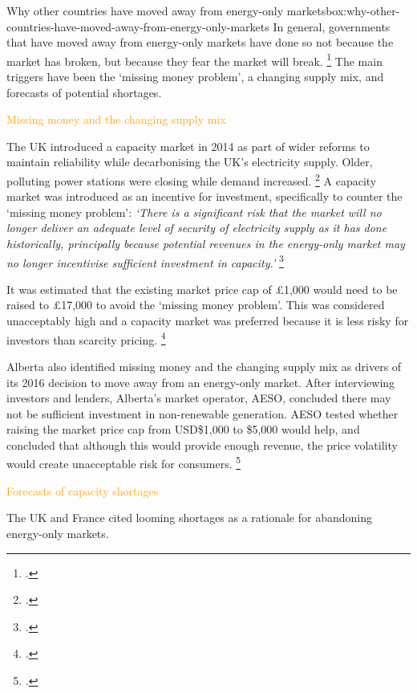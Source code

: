 \documentclass[FrontPage]{grattan}
\newenvironment{alphafootnotes}{}{}
\begin{document}
\begin{bigbox*}{Why other countries have moved away from energy-only markets}{box:why-other-countries-have-moved-away-from-energy-only-markets}
\setlength{\parskip}{6pt}
\setlength{\intextsep}{6pt}
\begin{alphafootnotes}
In general, governments that have moved away from energy-only markets have done so not because the market has broken, but because they fear the market will break.%
\footcite{CIGRE2016CapacityMechanisms}
The main triggers have been the `missing money problem', a changing supply mix, and forecasts of potential shortages.

\textcolor{Orange}{Missing money and the changing supply mix}

The UK introduced a capacity market in 2014 as part of wider reforms to maintain reliability while decarbonising the UK's electricity supply. Older, polluting power stations were closing while demand increased.%
\footcites{Ofgem2017EMR}{DECC2014EMR} 
A capacity market was introduced as an incentive for investment, specifically to counter the `missing money problem':
\emph{`There is a significant risk that the market will no longer deliver an adequate level of security of electricity supply as it has done historically, principally because potential revenues in the energy-only market may no longer incentivise sufficient investment in capacity.'}
\footcite[][1]{DECC2014EMRCapacityImpactAssessment}

It was estimated that the existing market price cap of £1,000 would need to be raised to £17,000 to avoid the `missing money problem'. This was considered unacceptably high and a capacity market was preferred because it is less risky for investors than scarcity pricing.%
\footcite[][59]{DECC2014EMRCapacityImpactAssessment}

Alberta also identified missing money and the changing supply mix as drivers of its 2016 decision to move away from an energy-only market. After interviewing investors and lenders, Alberta's market operator, AESO, concluded there may not be sufficient investment in non-renewable generation. AESO tested whether raising the market price cap from USD\$1,000 to \$5,000 would help, and concluded that although this would provide enough revenue, the price volatility would create unacceptable risk for consumers.%
\footcite{AESO2016AlbertaMarketReform}

\textcolor{Orange}{Forecasts of capacity shortages}

The UK and France cited looming shortages as a rationale for abandoning energy-only markets.


\end{alphafootnotes}
\end{bigbox*}
\end{document}
